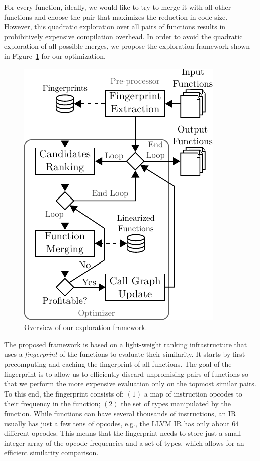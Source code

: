 
For every function, ideally, we would like to try to merge it with all other functions and choose the pair that maximizes the reduction in
code size. However, this quadratic exploration over all pairs of functions results in prohibitively expensive compilation
overhead. In order to avoid the quadratic exploration of all possible merges, we propose the exploration framework shown in
Figure~\ref{fig:func-merge-opt-arch} for our optimization.
\begin{figure}[t!]
  \centering
  \includegraphics[width=0.65\linewidth]{figs/func-merge-opt-arch.pdf}
  \caption{Overview of our exploration framework.}
  \label{fig:func-merge-opt-arch}
\end{figure}

The proposed framework is based on a light-weight ranking infrastructure that uses a \textit{fingerprint} of the functions to evaluate
their similarity. It starts by first precomputing and caching the fingerprint of all functions. The goal of the fingerprint is to allow us
to efficiently discard unpromising pairs of functions so that we perform the more expensive evaluation only on the topmost similar pairs.
To this end, the fingerprint consists of: $(1)$ a map of instruction opcodes to their frequency in the function; $(2)$ the set of types
manipulated by the function. While functions can have several thousands of instructions, an IR usually has just a few tens of opcodes,
e.g., the LLVM IR has only about 64 different opcodes. This means that the fingerprint needs to store just a small integer array of the
opcode frequencies and a set of types, which allows for an efficient similarity comparison.

